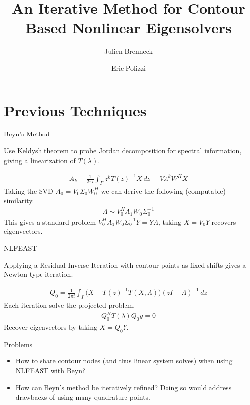 \documentclass[mathserif]{beamer}
\title{An Iterative Method for Contour Based Nonlinear Eigensolvers}
\author{Julien Brenneck \and Eric Polizzi}
\date{}
\begin{document}
\begin{frame}
 \titlepage{}
\end{frame}

\section{Previous Techniques}

\begin{frame}{Beyn's Method}

	Use Keldysh theorem to probe Jordan decomposition for spectral information, giving a linearization of \(T(\lambda)\).

	\begin{align}
		A_k = \frac{1}{2 \pi i} \int_\Gamma z^k {T(z)}^{-1} X \, dz 
		= V \Lambda^k W^H X
	\end{align}
	Taking the SVD \( A_0 = V_0 \Sigma_0 W_0^H \) we can derive the following (computable) similarity.
	\begin{align}
		\Lambda \sim V_0^H A_1 W_0 \Sigma_0^{-1}
	\end{align}
	This gives a standard problem \(  V_0^H A_1 W_0 \Sigma_0^{-1} Y = Y \Lambda\), taking \( X = V_0 Y  \) recovers eigenvectors.

\end{frame}

\begin{frame}{NLFEAST}

	Applying a Residual Inverse Iteration with contour points as fixed shifts gives a Newton-type iteration. 

	\begin{align}
		Q_0 = \frac{1}{2 \pi i } \int_\Gamma \Big(X - {T(z)}^{-1} T(X, \Lambda) \Big) {(zI - \Lambda)}^{-1} \, dz
	\end{align}
	Each iteration solve the projected problem.
	\begin{align}
		Q_0^H T(\lambda) Q_0 y = 0
	\end{align}
	Recover eigenvectors by taking \( X = Q_0 Y \).

\end{frame}

\begin{frame}{Problems}

	\begin{itemize}
		\item How to share contour nodes (and thus linear system solves) when using NLFEAST with Beyn?
		\vspace{2em}

		\item How can Beyn's method be iteratively refined? Doing so would address drawbacks of using many quadrature points.
	\end{itemize}

\end{frame}
\end{document}
